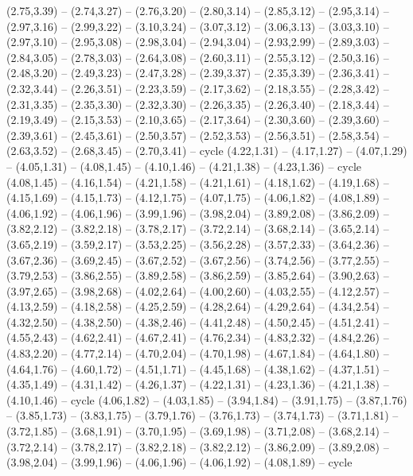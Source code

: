 \expandafter\def\csname geo:gebiet:MEX\endcsname{
  (2.75,3.39) -- (2.74,3.27) -- (2.76,3.20) -- (2.80,3.14) -- (2.85,3.12) -- (2.95,3.14) -- (2.97,3.16) -- (2.99,3.22) -- (3.10,3.24) -- (3.07,3.12) -- (3.06,3.13) -- (3.03,3.10) -- (2.97,3.10) -- (2.95,3.08) -- (2.98,3.04) -- (2.94,3.04) -- (2.93,2.99) -- (2.89,3.03) -- (2.84,3.05) -- (2.78,3.03) -- (2.64,3.08) -- (2.60,3.11) -- (2.55,3.12) -- (2.50,3.16) -- (2.48,3.20) -- (2.49,3.23) -- (2.47,3.28) -- (2.39,3.37) -- (2.35,3.39) -- (2.36,3.41) -- (2.32,3.44) -- (2.26,3.51) -- (2.23,3.59) -- (2.17,3.62) -- (2.18,3.55) -- (2.28,3.42) -- (2.31,3.35) -- (2.35,3.30) -- (2.32,3.30) -- (2.26,3.35) -- (2.26,3.40) -- (2.18,3.44) -- (2.19,3.49) -- (2.15,3.53) -- (2.10,3.65) -- (2.17,3.64) -- (2.30,3.60) -- (2.39,3.60) -- (2.39,3.61) -- (2.45,3.61) -- (2.50,3.57) -- (2.52,3.53) -- (2.56,3.51) -- (2.58,3.54) -- (2.63,3.52) -- (2.68,3.45) -- (2.70,3.41) -- cycle}
\expandafter\def\csname geo:gebiet:URY\endcsname{
  (4.22,1.31) -- (4.17,1.27) -- (4.07,1.29) -- (4.05,1.31) -- (4.08,1.45) -- (4.10,1.46) -- (4.21,1.38) -- (4.23,1.36) -- cycle}
\expandafter\def\csname geo:gebiet:BRA\endcsname{
  (4.08,1.45) -- (4.16,1.54) -- (4.21,1.58) -- (4.21,1.61) -- (4.18,1.62) -- (4.19,1.68) -- (4.15,1.69) -- (4.15,1.73) -- (4.12,1.75) -- (4.07,1.75) -- (4.06,1.82) -- (4.08,1.89) -- (4.06,1.92) -- (4.06,1.96) -- (3.99,1.96) -- (3.98,2.04) -- (3.89,2.08) -- (3.86,2.09) -- (3.82,2.12) -- (3.82,2.18) -- (3.78,2.17) -- (3.72,2.14) -- (3.68,2.14) -- (3.65,2.14) -- (3.65,2.19) -- (3.59,2.17) -- (3.53,2.25) -- (3.56,2.28) -- (3.57,2.33) -- (3.64,2.36) -- (3.67,2.36) -- (3.69,2.45) -- (3.67,2.52) -- (3.67,2.56) -- (3.74,2.56) -- (3.77,2.55) -- (3.79,2.53) -- (3.86,2.55) -- (3.89,2.58) -- (3.86,2.59) -- (3.85,2.64) -- (3.90,2.63) -- (3.97,2.65) -- (3.98,2.68) -- (4.02,2.64) -- (4.00,2.60) -- (4.03,2.55) -- (4.12,2.57) -- (4.13,2.59) -- (4.18,2.58) -- (4.25,2.59) -- (4.28,2.64) -- (4.29,2.64) -- (4.34,2.54) -- (4.32,2.50) -- (4.38,2.50) -- (4.38,2.46) -- (4.41,2.48) -- (4.50,2.45) -- (4.51,2.41) -- (4.55,2.43) -- (4.62,2.41) -- (4.67,2.41) -- (4.76,2.34) -- (4.83,2.32) -- (4.84,2.26) -- (4.83,2.20) -- (4.77,2.14) -- (4.70,2.04) -- (4.70,1.98) -- (4.67,1.84) -- (4.64,1.80) -- (4.64,1.76) -- (4.60,1.72) -- (4.51,1.71) -- (4.45,1.68) -- (4.38,1.62) -- (4.37,1.51) -- (4.35,1.49) -- (4.31,1.42) -- (4.26,1.37) -- (4.22,1.31) -- (4.23,1.36) -- (4.21,1.38) -- (4.10,1.46) -- cycle}
\expandafter\def\csname geo:gebiet:BOL\endcsname{
  (4.06,1.82) -- (4.03,1.85) -- (3.94,1.84) -- (3.91,1.75) -- (3.87,1.76) -- (3.85,1.73) -- (3.83,1.75) -- (3.79,1.76) -- (3.76,1.73) -- (3.74,1.73) -- (3.71,1.81) -- (3.72,1.85) -- (3.68,1.91) -- (3.70,1.95) -- (3.69,1.98) -- (3.71,2.08) -- (3.68,2.14) -- (3.72,2.14) -- (3.78,2.17) -- (3.82,2.18) -- (3.82,2.12) -- (3.86,2.09) -- (3.89,2.08) -- (3.98,2.04) -- (3.99,1.96) -- (4.06,1.96) -- (4.06,1.92) -- (4.08,1.89) -- cycle}
